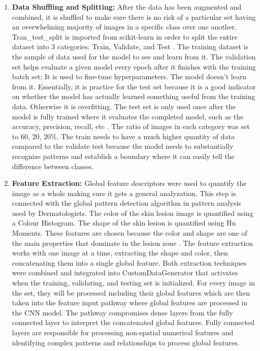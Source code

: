\documentclass[10pt,twocolumn]{article}
\begin{document}
\begin{enumerate}
    \newline
    \item \textbf{Data Shuffling and Splitting:} After the data has been augmented and combined, it is shuffled to make sure there is no risk of a particular set having an overwhelming majority of images in a specific class over one another. Tran\_test\_split is imported from scikit-learn in order to split the entire dataset into 3 categories: Train, Validate, and Test \cite{scikit}. \newline The training dataset is the sample of data used for the model to see and learn from it. \newline The validation set helps evaluate a given model every epoch after it finishes with the training batch set; It is used to fine-tune hyperparameters. The model doesn’t learn from it. Essentially, it is practice for the test set because it is a good indicator on whether the model has actually learned something useful from the training data. Otherwise it is overfitting. \newline The test set is only used once after the model is fully trained where it evaluates the completed model, such as the accuracy, precision, recall, etc \cite{Shah_2020}. The ratio of images in each category was set to 60, 20, 20\%. The train needs to have a much higher quantity of data compared to the validate test because the model needs to substantially recognize patterns and establish a boundary where it can easily tell the difference between classes. 
    \newline
    \item \textbf{Feature Extraction:} Global feature descriptors were used to quantify the image as a whole making sure it gets a general analyzation. This step is connected with the global pattern detection algorithm in pattern analysis used by Dermatologists. The color of the skin lesion image is quantified using a Colour Histogram. The shape of the skin lesion is quantified using Hu Moments. These features are chosen because the color and shape are one of the main properties that dominate in the lesion zone \cite{pham2021ai}. \newline \newline
    The feature extraction works with one image at a time, extracting the shape and color, then concatenating them into a single global feature. Both extraction techniques were combined and integrated into CustomDataGenerator that activates when the training, validating, and testing set is initialized. For every image in the set, they will be processed including their global features which are then taken into the feature input pathway where global features are processed in the CNN model. The pathway compromises dense layers from the fully connected layer to interpret the concatenated global features. Fully connected layers are responsible for processing non-spatial numerical features and identifying complex patterns and relationships to process global features.

\end{enumerate}
\end{document}
